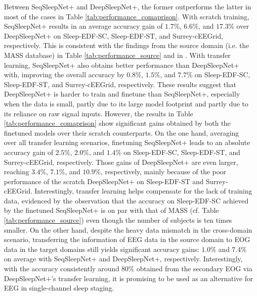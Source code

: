 \documentclass[journal,twoside,web]{ieeecolor}
\begin{document}
Between SeqSleepNet+ and DeepSleepNet+, the former outperforms the latter in most of the cases in Table \ref{tab:performance_comaprison}. With scratch training, SeqSleepNet+ results in an average accuracy gain of $1.7\%$, $6.6\%$, and $17.3\%$ over DeepSleepNet+ on Sleep-EDF-SC, Sleep-EDF-ST, and Surrey-cEEGrid, respectively. This is consistent with the findings from the source domain (i.e. the MASS database) in Table \ref{tab:performance_source} and in \cite{Phan2019a}. With transfer learning, SeqSleepNet+ also obtains better performance than DeepSleepNet+ with, improving the overall accuracy by $0.8\%$, $1.5\%$, and $7.7\%$ on Sleep-EDF-SC, Sleep-EDF-ST, and Surrey-cEEGrid, respectively. These results suggest that DeepSleepNet+ is harder to train and finetune than SeqSleepNet+, especially when the data is small, partly due to its large model footprint \cite{Supratak2017} and partly due to its reliance on raw signal inputs. However, the results in Table \ref{tab:performance_comaprison} show significant gains obtained by both the finetuned models over their scratch counterparts. On the one hand, averaging over all transfer learning scenarios, finetuning SeqSleepNet+ leads to an absolute accuracy gain of $2.5\%$, $2.0\%$, and $1.4\%$ on Sleep-EDF-SC, Sleep-EDF-ST, and Surrey-cEEGrid, respectively. Those gains of DeepSleepNet+ are even larger, reaching $3.4\%$, $7.1\%$, and $10.9\%$, respectively, mainly because of the poor performance of the scratch DeepSleepNet+ on Sleep-EDF-ST and Surrey-cEEGrid. Interestingly, transfer learning helps compensate for the lack of training data, evidenced by the observation that the accuracy on Sleep-EDF-SC achieved by the finetuned SeqSleepNet+ is on par with that of MASS (cf. Table \ref{tab:performance_source}) even though the number of subjects is ten times smaller. On the other hand, despite the heavy data mismatch in the cross-domain scenario, transferring the information of EEG data in the source domain to EOG data in the target domains still yields significant accuracy gains: $1.0\%$ and $7.4\%$ on average with SeqSleepNet+ and DeepSleepNet+, respectively. Interestingly, with the accuracy consistently around $80\%$ obtained from the secondary EOG via DeepSleepNet+'s transfer learning, it is promising to be used as an alternative for EEG in single-channel sleep staging.
\end{document}
